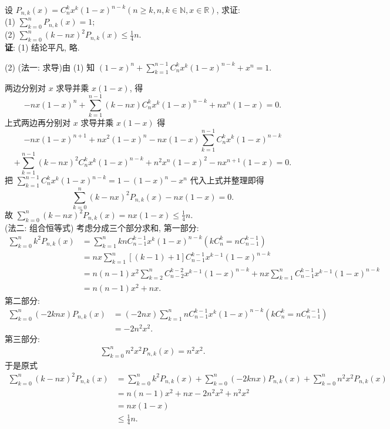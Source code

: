 \documentclass[UTF8]{ctexart}
\begin{document}
设 $P_{n,k}(x)=C_{n}^{k}x^k(1-x)^{n-k}(n\geq k,n,k\in\mathbb{N},x\in \mathbb{R})$, 求证:
\\
(1) $\displaystyle\sum\limits_{k=0}^{n}P_{n,k}(x)=1$;
\\
(2) $\displaystyle\sum\limits_{k=0}^{n}(k-nx)^2P_{n,k}(x)\leq\displaystyle\frac{1}{4}n$.
~\\

\textbf{证}: (1) 结论平凡, 略.

(2) (法一: 求导)由 (1) 知 $(1-x)^n+\sum\limits_{k=1}^{n-1}C_{n}^{k}x^k(1-x)^{n-k}+x^n=1$.

两边分别对 $x$ 求导并乘 $x(1-x)$, 得
\[
-nx(1-x)^n+\sum\limits_{k=1}^{n-1}(k-nx)C_{n}^{k}x^k(1-x)^{n-k}+nx^n(1-x)=0.
\]
上式两边再分别对 $x$ 求导并乘 $x(1-x)$ 得
\[
-nx(1-x)^{n+1}+nx^2(1-x)^n-nx(1-x)\sum\limits_{k=1}^{n-1}C_{n}^{k}x^k(1-x)^{n-k}
\]
\[
+\sum\limits_{k=1}^{n-1}(k-nx)^2C_{n}^{k}x^k(1-x)^{n-k}+n^2x^n(1-x)^2-nx^{n+1}(1-x)=0.
\]
把 $\displaystyle\sum\limits_{k=1}^{n-1}C_{n}^{k}x^k(1-x)^{n-k}=1-(1-x)^n-x^n$ 代入上式并整理即得
\[
\sum\limits_{k=0}^{n}(k-nx)^2P_{n,k}(x)-nx(1-x)=0.
\]
故 $\displaystyle\sum\limits_{k=0}^{n}(k-nx)^2P_{n,k}(x)=nx(1-x)\leq\displaystyle\frac{1}{4}n$.
~\\

(法二: 组合恒等式) 考虑分成三个部分求和, 第一部分:
\[\begin{aligned}
\sum\limits_{k=0}^{n}k^2P_{n,k}(x)&=\sum\limits_{k=1}^{n}knC_{n-1}^{k-1}x^k(1-x)^{n-k}(kC_{n}^{k}=nC_{n-1}^{k-1})\\
                                  &=nx\sum\limits_{k=1}^{n}[(k-1)+1]C_{n-1}^{k-1}x^{k-1}(1-x)^{n-k}\\
                                  &=n(n-1)x^2\sum\limits_{k=2}^{n}C_{n-2}^{k-2}x^{k-1}(1-x)^{n-k}+nx\sum\limits_{k=1}^{n}C_{n-1}^{k-1}x^{k-1}(1-x)^{n-k}\\
                                  &=n(n-1)x^2+nx.
\end{aligned}
\]
第二部分:
\[
\begin{aligned}
\sum\limits_{k=0}^{n}(-2knx)P_{n,k}(x)&=(-2nx)\sum\limits_{k=1}^{n}nC_{n-1}^{k-1}x^k(1-x)^{n-k}(kC_{n}^{k}=nC_{n-1}^{k-1})\\
                                      &=-2n^2x^2.
\end{aligned}
\]
第三部分:
\[
\begin{aligned}
\sum\limits_{k=0}^{n}n^2x^2P_{n,k}(x)=n^2x^2.
\end{aligned}
\]
于是原式
\[
\begin{aligned}
\sum\limits_{k=0}^{n}(k-nx)^2P_{n,k}(x)&=\sum\limits_{k=0}^{n}k^2P_{n,k}(x)+\sum\limits_{k=0}^{n}(-2knx)P_{n,k}(x)+\sum\limits_{k=0}^{n}n^2x^2P_{n,k}(x)\\
                                       &=n(n-1)x^2+nx-2n^2x^2+n^2x^2\\
                                       &=nx(1-x)\\
                                       &\leq\frac{1}{4}n.
\end{aligned}
\]
\end{document}
